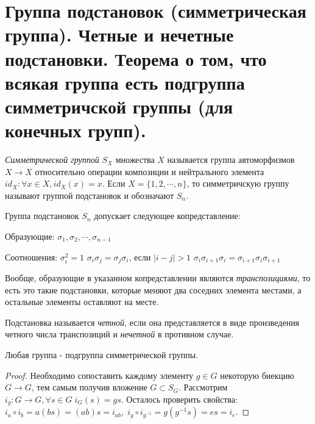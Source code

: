 \section{Группа подстановок (симметрическая группа). Четные и нечетные подстановки. 
Теорема о том, что всякая группа есть подгруппа симметричской группы (для конечных групп).}

\begin{defn} 
  \emph{Симметрической группой} $ S_{X} $ множества $ X $ называется группа автоморфизмов $ X \rightarrow X $
  относительно операции композиции и нейтрального элемента $ id_{X} : \forall x \in X, id_{X}(x) = x $. \newline
  Если $ X = \{1, 2, \cdots, n \} $, то симметричскую группу называют группой подстановок и обозначают $ S_{n} $. 
\end{defn}

Группа подстановок $ S_{n} $ допускает следующее копредставление: \newline

Образующие: \newline
$ \sigma_{1}, \sigma_{2}, \cdots ,\sigma_{n-1} $ \newline

Соотношения: \newline
$ \sigma_{i}^{2} = 1 $ \newline
$ \sigma_{i}\sigma_{j} = \sigma_{j}\sigma_{i} $, если $ |i - j| > 1 $ \newline
$ \sigma_{i}\sigma_{i+1}\sigma_{i} = \sigma_{i+1}\sigma_{i}\sigma_{i+1} $ \newline

Вообще, образующие в указанном копредставлении являются \emph{транспозициями}, то есть это такие подстановки,
которые меняют два соседних элемента местами, а остальные элементы оставляют на месте.

\begin{defn}
  Подстановка называется \emph{четной}, если она представляется в виде произведения четного числа транспозиций и 
  \emph{нечетной} в противном случае.
\end{defn}

\begin{thm}
  Любая группа - подгруппа симметрической группы.
\end{thm}
\begin{proof}
  Необходимо сопоставить каждому элементу $ g \in G $ некоторую биекцию $ G \rightarrow G $, тем самым получив вложение $ G \subset S_{G} $.
  Рассмотрим $ i_{g} : G \rightarrow G, \forall s \in G \; i_{G}(s) = gs $. 
  Осталось проверить свойства: $ i_{a} \circ i_{b} = a(bs) = (ab)s = i_{ab}, \; i_{g} \circ i_{g^{-1}} = g(g^{-1}s) = es = i_{e} $.
\end{proof}

